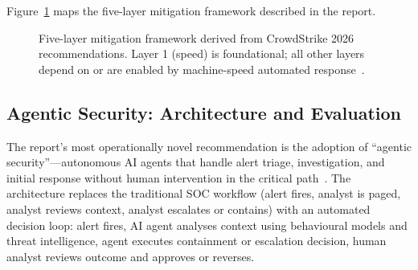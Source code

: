 \documentclass[journal]{IEEEtran}
\begin{document}
Figure~\ref{fig:mitigation_framework} maps the five-layer mitigation framework
described in the report.

\begin{figure}[h]
\centering
{}
\caption{Five-layer mitigation framework derived from CrowdStrike 2026 recommendations.
  Layer 1 (speed) is foundational; all other layers depend on or are enabled by
  machine-speed automated response~\cite{cs2026press,cs2026ransomware}.}
\label{fig:mitigation_framework}
\end{figure}

\subsection{Agentic Security: Architecture and Evaluation}

The report's most operationally novel recommendation is the adoption of
``agentic security''---autonomous AI agents that handle alert triage, investigation,
and initial response without human intervention in the critical path~\cite{cs2026press}.
The architecture replaces the traditional SOC workflow (alert fires, analyst is
paged, analyst reviews context, analyst escalates or contains) with an automated
decision loop: alert fires, AI agent analyses context using behavioural models and
threat intelligence, agent executes containment or escalation decision, human analyst
reviews outcome and approves or reverses.
\end{document}
